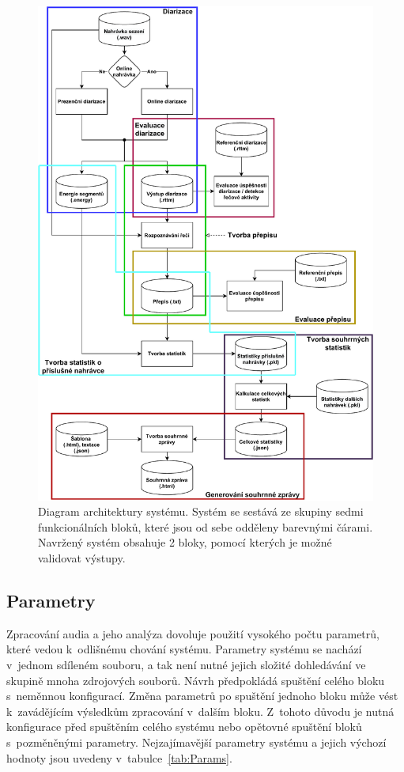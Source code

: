 \begin{figure}[H]
  \centering
  \includegraphics[height=0.9\textheight]{obrazky-figures/system_components.pdf}
  \caption{Diagram architektury systému. Systém se sestává ze skupiny sedmi funkcionálních bloků, které jsou od sebe odděleny barevnými čárami. Navržený systém obsahuje 2 bloky, pomocí kterých je možné validovat výstupy.}
  \label{fig:Architecture}
\end{figure}



\subsection{Parametry}
Zpracování audia a jeho analýza dovoluje použití vysokého počtu parametrů, které vedou k~odlišnému chování systému. Parametry systému se nachází v~jednom sdíleném souboru, a tak není nutné jejich složité dohledávání ve skupině mnoha zdrojových souborů. Návrh předpokládá spuštění celého bloku s~neměnnou konfigurací. Změna parametrů po spuštění jednoho bloku může vést k~zavádějícím výsledkům zpracování v~dalším bloku. Z~tohoto důvodu je nutná konfigurace před spuštěním celého systému nebo opětovné spuštění bloků s~pozměněnými parametry. Nejzajímavější parametry systému a jejich výchozí hodnoty jsou uvedeny v~tabulce~\ref{tab:Params}.

